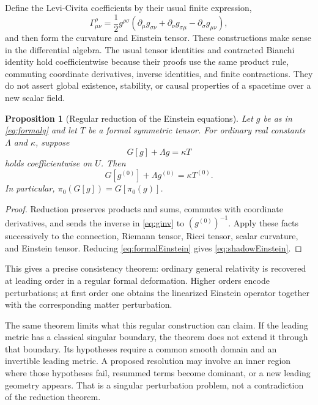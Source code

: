 \documentclass[11pt,letterpaper]{article}
\newtheorem{proposition}{Proposition}[section]
\theoremstyle{definition}
\theoremstyle{remark}
\begin{document}
Define the Levi-Civita coefficients by their usual finite expression,
\[
 \Gamma^\rho_{\mu\nu}
 =\frac12g^{\rho\sigma}
 (\partial_\mu g_{\sigma\nu}+\partial_\nu g_{\sigma\mu}
                  -\partial_\sigma g_{\mu\nu}),
\]
and then form the curvature and Einstein tensor. These constructions make
sense in the differential algebra. The usual tensor identities and contracted
Bianchi identity hold coefficientwise because their proofs use the same
product rule, commuting coordinate derivatives, inverse identities, and finite
contractions. They do not assert global existence, stability, or causal
properties of a spacetime over a new scalar field.

\begin{proposition}[Regular reduction of the Einstein equations]
\label{prop:reduction}
Let $g$ be as in \eqref{eq:formalg} and let $T$ be a formal symmetric tensor.
For ordinary real constants $\Lambda$ and $\kappa$, suppose
\begin{equation}
 G[g]+\Lambda g=\kappa T
 \label{eq:formalEinstein}
\end{equation}
holds coefficientwise on $U$. Then
\begin{equation}
 G[g^{(0)}]+\Lambda g^{(0)}=\kappa T^{(0)}.
 \label{eq:shadowEinstein}
\end{equation}
In particular, $\pi_0(G[g])=G[\pi_0(g)]$.
\end{proposition}
\begin{proof}
Reduction preserves products and sums, commutes with coordinate derivatives,
and sends the inverse in \eqref{eq:ginv} to $(g^{(0)})^{-1}$. Apply these facts
successively to the connection, Riemann tensor, Ricci tensor, scalar curvature,
and Einstein tensor. Reducing \eqref{eq:formalEinstein} gives
\eqref{eq:shadowEinstein}.
\end{proof}

This gives a precise consistency theorem: ordinary general relativity is
recovered at leading order in a regular formal deformation. Higher orders
encode perturbations; at first order one obtains the linearized Einstein
operator together with the corresponding matter perturbation.

The same theorem limits what this regular construction can claim. If the
leading metric has a classical singular boundary, the theorem does not extend
it through that boundary. Its hypotheses require a common smooth domain and
an invertible leading metric. A proposed resolution may involve an inner
region where those hypotheses fail, resummed terms become dominant, or a new
leading geometry appears. That is a singular perturbation problem, not a
contradiction of the reduction theorem.
\end{document}
